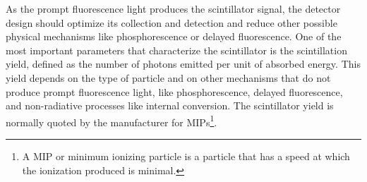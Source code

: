 As the prompt fluorescence light produces the scintillator signal, the detector design should optimize its collection and detection and reduce other possible physical mechanisms like phosphorescence or delayed fluorescence. One of the most important parameters that characterize the scintillator is the scintillation yield, defined as the number of photons emitted per unit of absorbed energy. This yield depends on the type of particle and on other mechanisms that do not produce prompt fluorescence light, like phosphorescence, delayed fluorescence, and non-radiative processes like internal conversion. The scintillator yield is normally quoted by the manufacturer for MIPs\footnote{A MIP or minimum ionizing particle is a particle that has a speed at which the ionization produced is minimal.}.
